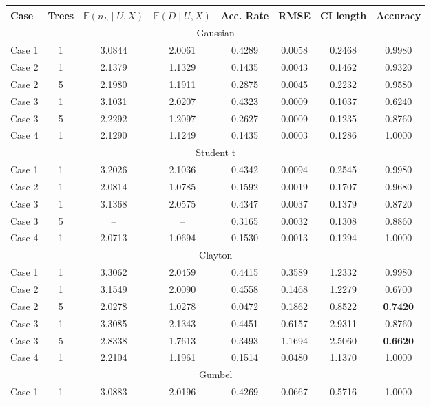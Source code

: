 \documentclass{amsart}
\begin{document}
\begin{table}[ht]
	\centering
	\scriptsize{
	\begin{tabular}{lc|cccccc}
		\toprule
		Case & Trees & $\mathbb{E}(n_L\mid U,X)$ & $\mathbb{E}(D\mid U,X)$ & Acc. Rate & RMSE & CI length & Accuracy \\ 
		\midrule
		\multicolumn{8}{c}{Gaussian} \\
		\midrule
		Case 1 & 1 & 3.0844 & 2.0061 & 0.4289 & 0.0058 & 0.2468 & 0.9980 \\ 
		Case 2 & 1 & 2.1379 & 1.1329 & 0.1435 & 0.0043 & 0.1462 & 0.9320 \\ 
		Case 2 & 5 & 2.1980 & 1.1911 & 0.2875 & 0.0045 & 0.2232 & 0.9580 \\ 
		Case 3 & 1 & 3.1031 & 2.0207 & 0.4323 & 0.0009 & 0.1037 & 0.6240 \\
		Case 3 & 5 & 2.2292 & 1.2097 & 0.2627 & 0.0009 & 0.1235 & 0.8760 \\ 
		Case 4 & 1 & 2.1290 & 1.1249 & 0.1435 & 0.0003 & 0.1286 & 1.0000 \\ 
		\midrule
		\multicolumn{8}{c}{Student t} \\
		\midrule
		Case 1 & 1 & 3.2026 & 2.1036 & 0.4342 & 0.0094 & 0.2545 & 0.9980 \\ 
		Case 2 & 1 & 2.0814 & 1.0785 & 0.1592 & 0.0019 & 0.1707 & 0.9680 \\ 
		Case 3 & 1 & 3.1368 & 2.0575 & 0.4347 & 0.0037 & 0.1379 & 0.8720 \\ 
		Case 3 & 5 & -- & -- & 0.3165 & 0.0032 & 0.1308 & 0.8860 \\
		Case 4 & 1 & 2.0713 & 1.0694 & 0.1530 & 0.0013 & 0.1294 & 1.0000 \\ 
		\midrule
		\multicolumn{8}{c}{Clayton} \\
		\midrule
		Case 1 & 1 & 3.3062 & 2.0459 & 0.4415 & 0.3589 & 1.2332 & 0.9980 \\ 
		Case 2 & 1 & 3.1549 & 2.0090 & 0.4558 & 0.1468 & 1.2279 & 0.6700 \\ 
		Case 2 & 5 & 2.0278 & 1.0278 & 0.0472 & 0.1862 & 0.8522 & \textbf{0.7420} \\ 
		Case 3 & 1 & 3.3085 & 2.1343 & 0.4451 & 0.6157 & 2.9311 & 0.8760 \\ 
		Case 3 & 5 & 2.8338 & 1.7613 & 0.3493 & 1.1694 & 2.5060 & \textbf{0.6620} \\ 
		Case 4 & 1 & 2.2104 & 1.1961 & 0.1514 & 0.0480 & 1.1370 & 1.0000 \\
		\midrule
		\multicolumn{8}{c}{Gumbel} \\
		\midrule
		Case 1 & 1 & 3.0883 & 2.0196 & 0.4269 & 0.0667 & 0.5716 & 1.0000 \\ 

\end{tabular}}
\end{table}
\end{document}
